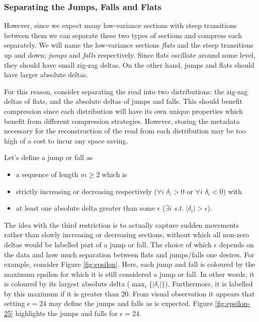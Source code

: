\subsubsection{Separating the Jumps, Falls and Flats}

However, since we expect many low-variance sections with steep transitions
between them we can separate these two types of sections and compress each
separately. We will name the low-variance sections \textit{flats} and the
steep transitions up and down; \textit{jumps} and \textit{falls} respectively.
Since flats oscillate around some level, they should have small zig-zag deltas.
On the other hand, jumps and flats should have larger absolute deltas.



For this reason, consider separating the read into two distributions: the
zig-zag deltas of flats, and the absolute deltas of jumps and falls. This should
benefit compression since each distribution will have its own unique properties
which benefit from different compression strategies. However, storing the
metadata necessary for the reconstruction of the read from each distribution may
be too high of a cost to incur any space saving.

Let's define a jump or fall as
\begin{itemize}
	\item a sequence of length $m\ge 2$ which is
	\item strictly increasing or decreasing respectively ($\forall i$ $\delta_i>0$ or $\forall i$ $\delta_i < 0$) with
	\item at least one absolute delta greater than some $\epsilon$ ($\exists i$ $s.t.$ $|\delta_i|>\epsilon$).
\end{itemize}

The idea with the third restriction is to actually capture sudden movements
rather than slowly increasing or decreasing sections, without which all non-zero
deltas would be labelled part of a jump or fall. The choice of which $\epsilon$
depends on the data and how much separation between flats and jumps/falls one
desires. For example, consider Figure \ref{fig:epsilon}. Here, each jump and fall
is coloured by the maximum epsilon for which it is still considered a jump or
fall. In other words, it is coloured by its largest absolute delta
($\max_i\{|\delta_i|\}$). Furthermore, it is labelled by this maximum if it is
greater than 20. From visual observation it appears that setting $\epsilon=24$
may define the jumps and falls as is expected. Figure \ref{fig:epsilon-25}
highlights the jumps and falls for $\epsilon=24$.


